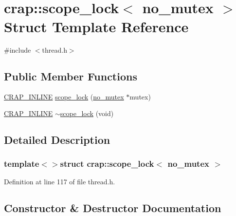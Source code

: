\hypertarget{structcrap_1_1scope__lock_3_01no__mutex_01_4}{}\section{crap\+:\+:scope\+\_\+lock$<$ no\+\_\+mutex $>$ Struct Template Reference}
\label{structcrap_1_1scope__lock_3_01no__mutex_01_4}


{\ttfamily \#include $<$thread.\+h$>$}

\subsection*{Public Member Functions}
\begin{DoxyCompactItemize}
\item 
\hyperlink{config__x86_8h_a5a40526b8d842e7ff731509998bb0f1c}{C\+R\+A\+P\+\_\+\+I\+N\+L\+I\+N\+E} \hyperlink{structcrap_1_1scope__lock_3_01no__mutex_01_4_a70fc64b20e73f3311c0e86270cc8714e}{scope\+\_\+lock} (\hyperlink{structcrap_1_1no__mutex}{no\+\_\+mutex} $\ast$mutex)
\item 
\hyperlink{config__x86_8h_a5a40526b8d842e7ff731509998bb0f1c}{C\+R\+A\+P\+\_\+\+I\+N\+L\+I\+N\+E} \hyperlink{structcrap_1_1scope__lock_3_01no__mutex_01_4_a4b39f2ddc9942d59448c669840f8a5ba}{$\sim$scope\+\_\+lock} (void)
\end{DoxyCompactItemize}


\subsection{Detailed Description}
\subsubsection*{template$<$$>$struct crap\+::scope\+\_\+lock$<$ no\+\_\+mutex $>$}



Definition at line 117 of file thread.\+h.



\subsection{Constructor \& Destructor Documentation}
\hypertarget{structcrap_1_1scope__lock_3_01no__mutex_01_4_a70fc64b20e73f3311c0e86270cc8714e}{}
